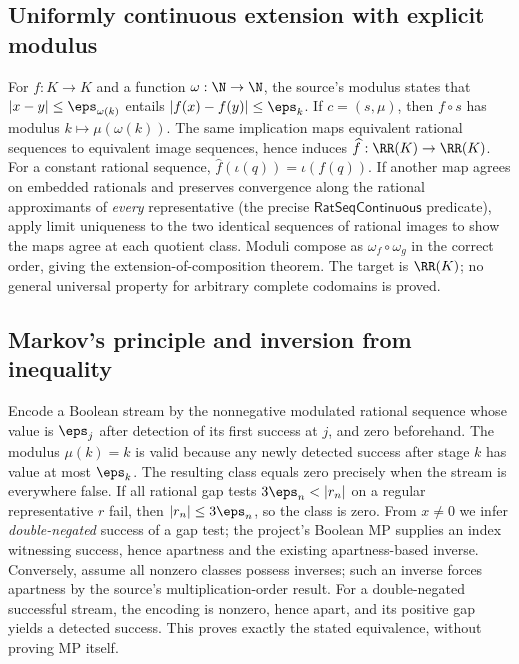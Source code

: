 \subsection{Uniformly continuous extension with explicit modulus}\label{supp:13-7}
\par{}\par\smallskip

For $f:K\to K$ and a function $\omega:\N\to\N$, the source's modulus states that $|x-y|\le\eps_{\omega(k)}$ entails $|f(x)-f(y)|\le\eps_k$. If $c=(s,\mu)$, then $f\circ s$ has modulus $k\mapsto\mu(\omega(k))$. The same implication maps equivalent rational sequences to equivalent image sequences, hence induces $\widehat f:\RR(K)\to\RR(K)$. For a constant rational sequence, $\widehat f(\iota(q))=\iota(f(q))$. If another map agrees on embedded rationals and preserves convergence along the rational approximants of \emph{every} representative (the precise $\mathsf{RatSeqContinuous}$ predicate), apply limit uniqueness to the two identical sequences of rational images to show the maps agree at each quotient class. Moduli compose as $\omega_f\circ\omega_g$ in the correct order, giving the extension-of-composition theorem. The target is $\RR(K)$; no general universal property for arbitrary complete codomains is proved.

\subsection{Markov's principle and inversion from inequality}\label{supp:14-1}
\par{}\par\smallskip

Encode a Boolean stream by the nonnegative modulated rational sequence whose value is $\eps_j$ after detection of its first success at $j$, and zero beforehand. The modulus $\mu(k)=k$ is valid because any newly detected success after stage $k$ has value at most $\eps_k$. The resulting class equals zero precisely when the stream is everywhere false. If all rational gap tests $3\eps_n<|r_n|$ on a regular representative $r$ fail, then $|r_n|\le3\eps_n$, so the class is zero. From $x\ne0$ we infer \emph{double-negated} success of a gap test; the project's Boolean MP supplies an index witnessing success, hence apartness and the existing apartness-based inverse. Conversely, assume all nonzero classes possess inverses; such an inverse forces apartness by the source's multiplication-order result. For a double-negated successful stream, the encoding is nonzero, hence apart, and its positive gap yields a detected success. This proves exactly the stated equivalence, without proving MP itself.

